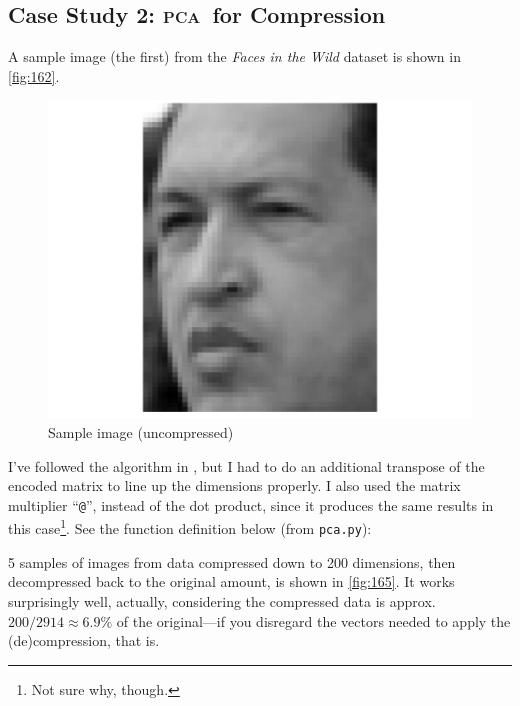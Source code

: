 \documentclass[british]{article}
\newcommand{\pca}{\texorpdfstring{\textsc{pca}}{PCA}}
\begin{document}
\subsection{Case Study 2: \pca\ for Compression}



A sample image (the first) from the \emph{Faces in the Wild} dataset is shown
in \autoref{fig:162}.

\begin{figure}
  \centering
  \includegraphics[width=0.9\columnwidth]{fig/162.pdf}
  \caption{Sample image (uncompressed)}
  \label{fig:162}
\end{figure}


I've followed the algorithm in \cite[page 137]{marsland}, but I had to do an
additional transpose of the encoded matrix to line up the dimensions properly.
I also used the matrix multiplier \enquote{\texttt @}, instead of the dot
product, since it produces the same results in this case\footnote{Not sure why,
though.}. See the function definition below (from \texttt{pca.py}):





5 samples of images from data compressed down to 200 dimensions, then
decompressed back to the original amount, is shown in \autoref{fig:165}. It
works surprisingly well, actually, considering the compressed data is
approx.~$200/2914 \approx 6.9\%$ of the original---if you disregard the vectors
needed to apply the (de)compression, that is.
\end{document}
